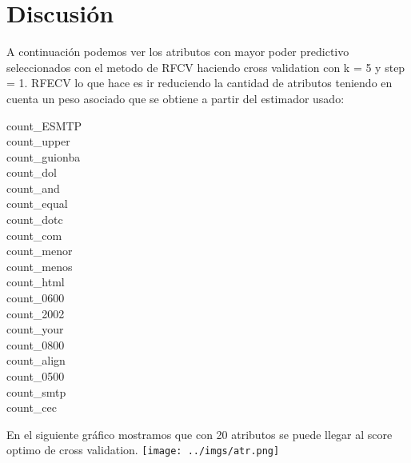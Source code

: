 \documentclass[10pt, a4paper]{article}
\begin{document}
% 
 
\section{Discusión}
 
 A continuación podemos ver los atributos con mayor poder predictivo seleccionados con el metodo de RFCV haciendo cross validation con k = 5 y step = 1. RFECV lo que hace es ir reduciendo la cantidad de atributos teniendo en cuenta un peso asociado que se obtiene a partir del estimador usado:

\begin{description}
\item [count\_ESMTP]
\item [count\_upper]
\item [count\_guionba]
\item [count\_dol
\item [count\_arr]
\item [count\_and]
\item [count\_equal]
\item [count\_dotc]
\item [count\_com]
\item [count\_menor]
\item [count\_menos]
\item [count\_html]
\item [count\_0600]
\item [count\_2002]
\item [count\_your]
\item [count\_0800]
\item [count\_align]
\item [count\_0500]
\item [count\_smtp]
\item [count\_cec]
\end{description}


En el siguiente gráfico mostramos que con 20 atributos se puede llegar al score optimo de cross validation.
\texttt{[image: ../imgs/atr.png]}


\end{document}

